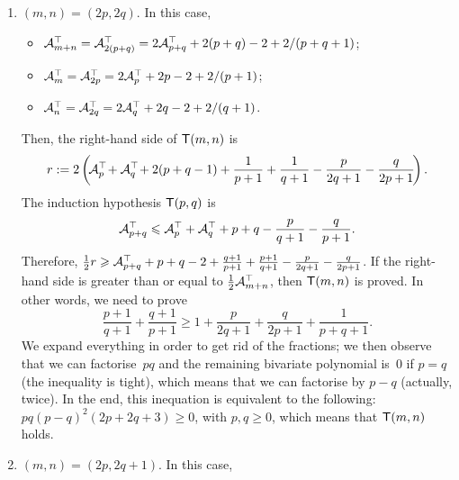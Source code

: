 \begin{enumerate}

  \item \((m,n) = (2p,2q)\). In this case,
    \begin{itemize}

      \item \(\mathcal{A}_{m+n}^{\top} = \mathcal{A}_{2(p+q)}^{\top} =
        2\mathcal{A}_{p+q}^{\top} + 2(p+q) - 2 + 2/(p+q+1)\);

      \item \(\mathcal{A}_{m}^{\top} = \mathcal{A}_{2p}^{\top} =
        2\mathcal{A}_{p}^{\top} + 2p - 2 + 2/(p+1)\);

      \item \(\mathcal{A}_{n}^{\top} = \mathcal{A}_{2q}^{\top} = 
        2\mathcal{A}_{q}^{\top} + 2q - 2 + 2/(q+1)\).

    \end{itemize}
    Then, the right-hand side of \(\textsf{T}({m,n})\) is
    \begin{equation*}
      r := 2\left(\!\mathcal{A}_{p}^{\top}\! + \mathcal{A}_{q}^{\top}\! + 2(p+q-1)
        + \frac{1}{p+1} + \frac{1}{q+1} - \frac{p}{2q+1} - 
        \frac{q}{2p+1}\!\right).
    \end{equation*}
    The induction hypothesis \(\textsf{T}({p,q})\) is
    \begin{equation*}
      \mathcal{A}_{p+q}^{\top} \leqslant \mathcal{A}_{p}^{\top} +
      \mathcal{A}_{q}^{\top} + p + q - \frac{p}{q+1} - \frac{q}{p+1}.
    \end{equation*}
    Therefore, \(\tfrac{1}{2}r \geqslant \mathcal{A}_{p+q}^{\top} + p + q -
    2 + \tfrac{q+1}{p+1} + \tfrac{p+1}{q+1} - \tfrac{p}{2q+1} -
    \tfrac{q}{2p+1}\). If the right-hand side is greater than or
    equal to \(\tfrac{1}{2}\mathcal{A}_{m+n}^{\top}\), then
    \(\textsf{T}({m,n})\) is proved. In other words, we need to prove
    \begin{equation*}
      \frac{p+1}{q+1} + \frac{q+1}{p+1} \geqslant 1 +
      \frac{p}{2q+1} + \frac{q}{2p+1} + \frac{1}{p+q+1}.
    \end{equation*}
    We expand everything in order to get rid of the fractions; we then
    observe that we can factorise~\(pq\) and the remaining bivariate
    polynomial is~\(0\) if \(p=q\) (the inequality is tight), which
    means that we can factorise by \(p-q\) (actually, twice). In the
    end, this inequation is equivalent to the following:
    \(pq(p-q)^2(2p+2q+3) \geqslant 0\), with \(p,q \geqslant 0\),
    which means that \(\textsf{T}({m,n})\) holds.

  \item \((m,n) = (2p,2q+1)\). In this case,
    \begin{itemize}


\end{itemize}
\end{enumerate}
